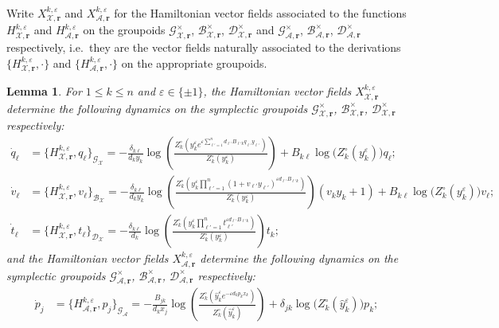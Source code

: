 \documentclass{amsart}
\newtheorem{lemma}[theorem]{Lemma}
\numberwithin{equation}{section}
\newcommand{\bfr}{{\boldsymbol{r}}}
\newcommand{\cA}{\mathcal{A}}
\newcommand{\cB}{\mathcal{B}}
\newcommand{\cD}{\mathcal{D}}
\newcommand{\cG}{\mathcal{G}}
\newcommand{\cX}{\mathcal{X}}
\begin{document}
Write $X_{\cX,\bfr}^{k,\varepsilon}$ and $X_{\cA,\bfr}^{k,\varepsilon}$ for the Hamiltonian vector fields associated to the functions $H_{\cX,\bfr}^{k,\varepsilon}$ and $H_{\cA,\bfr}^{k,\varepsilon}$ on the groupoids $\cG^\times_{\cX,\bfr}$, $\cB^\times_{\cX,\bfr}$, $\cD^\times_{\cX,\bfr}$ and $\cG^\times_{\cA,\bfr}$, $\cB^\times_{\cA,\bfr}$, $\cD^\times_{\cA,\bfr}$ respectively, i.e.\ they are the vector fields naturally associated to the derivations $\{H_{\cX,\bfr}^{k,\varepsilon},\cdot\}$ and $\{H_{\cA,\bfr}^{k,\varepsilon},\cdot\}$ on the appropriate groupoids.
\begin{lemma}
  For $1\le k\le n$ and $\varepsilon\in\{\pm1\}$, the Hamiltonian vector fields $X_{\cX,\bfr}^{k,\varepsilon}$ determine the following dynamics on the symplectic groupoids $\cG^\times_{\cX,\bfr}$, $\cB^\times_{\cX,\bfr}$, $\cD^\times_{\cX,\bfr}$ respectively:
  \begin{align*}
    \dot q_\ell&=\{H_{\cX,\bfr}^{k,\varepsilon},q_\ell\}_{\cG_\cX}=-\frac{\delta_{k\ell}}{d_ky_k}\log\left(\frac{Z_k^\circ\left(y_k^\varepsilon e^{\varepsilon\sum_{\ell'=1}^n d_{\ell'} B_{\ell' k}q_{\ell'} y_{\ell'}}\right)}{Z_k^\circ(y_k^\varepsilon)}\right)+B_{k\ell}\log\big(Z_k^\circ(y_k^\varepsilon)\big)q_\ell;\\
    \dot v_\ell&=\{H_{\cX,\bfr}^{k,\varepsilon},v_\ell\}_{\cB_\cX}=-\frac{\delta_{k\ell}}{d_ky_k}\log\left(\frac{Z_k^\circ\left(y_k^\varepsilon \prod_{\ell'=1}^n (1+v_{\ell'}y_{\ell'})^{\varepsilon d_{\ell'} B_{\ell' k}}\right)}{Z_k^\circ(y_k^\varepsilon)}\right)(v_ky_k+1)+B_{k\ell}\log\big(Z_k^\circ(y_k^\varepsilon)\big)v_\ell;\\
    \dot t_\ell&=\{H_{\cX,\bfr}^{k,\varepsilon},t_\ell\}_{\cD_\cX}=-\frac{\delta_{k\ell}}{d_k}\log\left(\frac{Z_k^\circ\left(y_k^\varepsilon \prod_{\ell'=1}^nt_{\ell'}^{\varepsilon d_{\ell'} B_{\ell' k}}\right)}{Z_k^\circ(y_k^\varepsilon)}\right)t_k;
  \end{align*}
  and the Hamiltonian vector fields $X_{\cA,\bfr}^{k,\varepsilon}$ determine the following dynamics on the symplectic groupoids $\cG^\times_{\cA,\bfr}$, $\cB^\times_{\cA,\bfr}$, $\cD^\times_{\cA,\bfr}$ respectively:
  \begin{align}
    \label{eq:p dot}
    \dot p_j&=\{H_{\cA,\bfr}^{k,\varepsilon},p_j\}_{\cG_\cA}=-\frac{B_{jk}}{d_kx_j}\log\left(\frac{Z_k^\circ\left(\hat y_k^\varepsilon e^{-\varepsilon d_kp_kx_k}\right)}{Z_k^\circ(\hat y_k^\varepsilon)}\right)+\delta_{jk}\log\big(Z_k^\circ(\hat y_k^\varepsilon)\big)p_k;\\
    \nonumber

\end{align}
\end{lemma}
\end{document}
